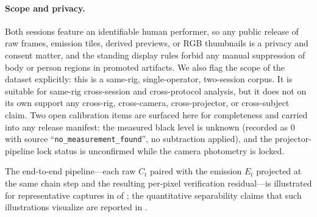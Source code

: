 \paragraph{Scope and privacy.} Both sessions feature an identifiable human performer, so any public release of raw frames, emission tiles, derived previews, or RGB thumbnails is a privacy and consent matter, and the standing display rules forbid any manual suppression of body or person regions in promoted artifacts. We also flag the scope of the dataset explicitly: this is a same-rig, single-operator, two-session corpus. It is suitable for same-rig cross-session and cross-protocol analysis, but it does not on its own support any cross-rig, cross-camera, cross-projector, or cross-subject claim. Two open calibration items are surfaced here for completeness and carried into any release manifest: the measured black level is unknown (recorded as $0$ with source ``\texttt{no\_measurement\_found}'', no subtraction applied), and the projector-pipeline lock status is unconfirmed while the camera photometry is locked.

The end-to-end pipeline---each raw $C_t$ paired with the emission $E_t$ projected at the same chain step and the resulting per-pixel verification residual---is illustrated for representative captures in  of ; the quantitative separability claims that such illustrations visualize are reported in .
